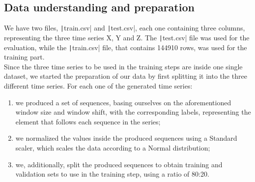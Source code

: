 \documentclass[12pt,a4paper,leqno]{article}
\begin{document}
	\subsection{Data understanding and preparation}
	We have two files, \texttt|train.csv| and \texttt|test.csv|, each one containing three columns, representing the three time series X, Y and Z. The \texttt|test.csv| file was used for the evaluation, while the \texttt|train.csv| file, that contains 144910 rows, was used for the training part.\\
	Since the three time series to be used in the training steps are inside one single dataset, we started the preparation of our data by first splitting it into the three different time series. For each one of the generated time series:
	\begin{enumerate}
		\item we produced a set of sequences, basing ourselves on the aforementioned window size and window shift, with the corresponding labels, representing the element that follows each sequence in the series;
		\item we normalized the values inside the produced sequences using a Standard scaler, which scales the data according to a Normal distribution;
		\item we, additionally, split the produced sequences to obtain training and validation sets to use in the training step, using a ratio of 80:20.
	\end{enumerate}
	
\end{document}
